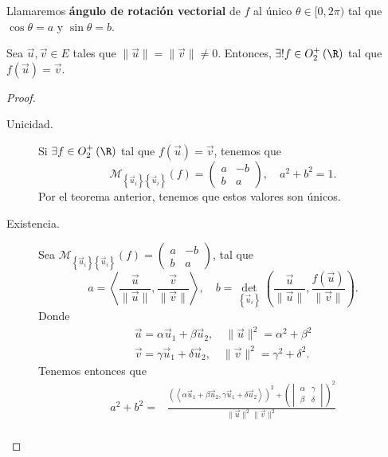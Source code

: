 \begin{fdefinition}[]
\normalfont Llamaremos \textbf{ángulo de rotación vectorial} de $\displaystyle f $ al único $\displaystyle \theta \in [0,2\pi) $ tal que $\displaystyle \cos\theta = a $ y $\displaystyle \sin\theta = b $.
\end{fdefinition}
\begin{ftheorem}[]
\normalfont Sea $\displaystyle \vec{u}, \vec{v} \in E $ tales que $\displaystyle \|\vec{u}\| = \|\vec{v}\| \neq 0 $. Entonces, $\displaystyle \exists ! f \in O^{+}_{2}\left(\R\right)$ tal que $\displaystyle f\left(\vec{u}\right) = \vec{v} $.
\end{ftheorem}
\begin{proof}
\begin{description}
\item[Unicidad.] Si $\displaystyle \exists f \in O^{+}_{2}\left(\R\right) $ tal que $\displaystyle f\left(\vec{u}\right) = \vec{v} $, tenemos que
	\[ \mathcal{M}_{ \left\{ \vec{u}_{i}\right\} \left\{ \vec{u}_{i}\right\} }\left(f\right) = \begin{pmatrix} a & - b \\ b & a \end{pmatrix}, \quad a^{2} + b^{2} = 1 .\]
	Por el teorema anterior, tenemos que estos valores son únicos.
\item[Existencia.] Sea $\displaystyle \mathcal{M}_{ \left\{ \vec{u}_{i}\right\} \left\{ \vec{u}_{i}\right\} }\left(f\right) = \begin{pmatrix} a & - b \\ b & a \end{pmatrix} $, tal que 
	\[ a = \left\langle \frac{\vec{u}}{\|\vec{u}\|}, \frac{\vec{v}}{\|\vec{v}\|} \right\rangle , \quad b = \det_{ \left\{ \vec{u}_{i}\right\}}\left(\frac{\vec{u}}{\|\vec{u}\|},\frac{f\left(\vec{u}\right)}{\|\vec{v}\|}\right) .\]
	Donde 
\[
\begin{split}
	\vec{u} = \alpha\vec{u}_{1} + \beta\vec{u}_{2}, \quad \|\vec{u}\|^{2} = \alpha^{2} + \beta^{2} \\
	\vec{v} = \gamma \vec{u}_{1} + \delta \vec{u}_{2}, \quad \|\vec{v}\|^{2} = \gamma^{2} + \delta^{2}.
\end{split}
\]
Tenemos entonces que
\[
\begin{split}
	a^{2} + b^{2} = & \frac{\left(\left\langle \alpha\vec{u}_{1}+\beta\vec{u}_{2}, \gamma\vec{u}_{1} + \delta \vec{u}_{2} \right\rangle \right)^{2} + \left(\begin{vmatrix} \alpha & \gamma \\ \beta & \delta  \end{vmatrix} \right)^{2}}{\|\vec{u}\|^{2}\|\vec{v}\|^{2}} \\

\end{split}\]
\end{description}
\end{proof}
